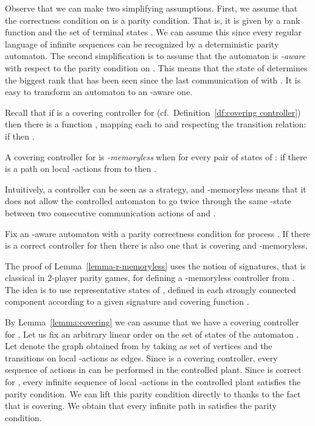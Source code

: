 \documentclass[10pt,a4paper]{article}
\begin{document}
Observe that we can make two simplifying assumptions. First, we assume
that the correctness condition on  is a parity condition. That is,
it is given by a rank function  and the set of
terminal states . We can assume this since every regular language
of infinite sequences can be recognized by a deterministic parity
automaton. The second simplification is to assume that the automaton  is
\emph{-aware} with respect to the parity condition on . This
means that the state of  determines the biggest rank that
has been seen since the last communication of  with . It is easy
to transform an automaton to an -aware one.










Recall that if  is a covering controller for  (cf.\
Definition~\ref{df:covering controller}) then
there is a function , mapping each  to  and respecting
the transition relation: if  then
. 


\begin{definition}
  A covering controller  for  is \emph{-memoryless} when
  for every pair of states  of : 
if there
  is a path on local -actions from  to  then
  .
\end{definition}


Intuitively, a controller can be seen as a strategy, and -memoryless
means that it does not allow the controlled automaton to go twice
through the same -state between two consecutive communication
actions of  and .


\begin{lemma}\label{lemma-r-memoryless}
  Fix an -aware automaton  with a parity correctness condition
  for process . 
  If there is a correct controller for  then there is
  also one that is covering and -memoryless.
\end{lemma}




The proof of Lemma~\ref{lemma-r-memoryless} uses the notion of
  signatures, that is classical in 2-player parity games, for defining
  a -memoryless controller  from . The idea is to use
  representative states of , defined in each strongly connected
  component according to a given signature and covering function
  .

By Lemma~\ref{lemma:covering} we can assume that we have a covering
controller for . Let us fix an arbitrary
linear order on the set  of states of the automaton . Let
 denote the graph obtained from  by taking  as
set of vertices and the transitions on local -actions as
edges. Since  is a covering controller, every sequence of actions
in  can be performed in the controlled plant. Since  is
correct for , every
infinite sequence of local -actions in the controlled plant
satisfies the parity condition. We can lift this parity condition
directly to  thanks to the fact that  is covering. We obtain
that every infinite path in  satisfies the parity condition.
\end{document}
